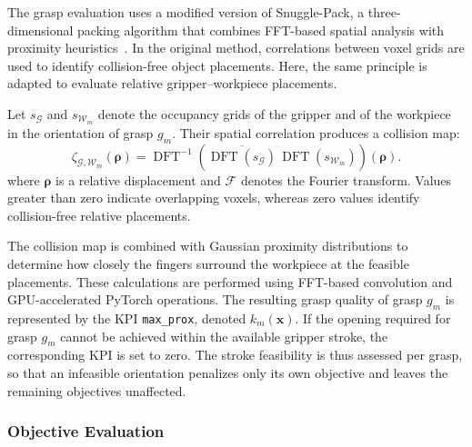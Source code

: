 The grasp evaluation uses a modified version of Snuggle-Pack, a three-dimensional packing algorithm
that combines FFT-based spatial analysis with proximity heuristics~\cite{snuggle_pack}. In the
original method, correlations between voxel grids are used to identify collision-free object
placements. Here, the same principle is adapted to evaluate relative gripper--workpiece placements.

Let $s_{\mathcal{G}}$ and $s_{\mathcal{W}_m}$ denote the occupancy grids of the gripper and of the
workpiece in the orientation of grasp $g_m$. Their spatial correlation produces a collision map:
\begin{equation}
    \zeta_{\mathcal{G},\mathcal{W}_m}(\boldsymbol{\rho})
    =
    \operatorname{DFT}^{-1}
    \left(
        \overline{\operatorname{DFT}(s_{\mathcal{G}})}
        \,\operatorname{DFT}(s_{\mathcal{W}_m})
    \right)(\boldsymbol{\rho}).
\end{equation}
where $\boldsymbol{\rho}$ is a relative displacement and $\mathcal{F}$ denotes the Fourier transform.
Values greater than zero indicate overlapping voxels, whereas zero values identify collision-free
relative placements.

The collision map is combined with Gaussian proximity distributions to determine how closely the
fingers surround the workpiece at the feasible placements. These calculations are performed using
FFT-based convolution and GPU-accelerated PyTorch operations. The resulting grasp quality of grasp
$g_m$ is represented by the KPI \texttt{max\_prox}, denoted $k_m(\mathbf{x})$. If the opening
required for grasp $g_m$ cannot be achieved within the available gripper stroke, the corresponding
KPI is set to zero. The stroke feasibility is thus assessed per grasp, so that an infeasible
orientation penalizes only its own objective and leaves the remaining objectives unaffected.


\subsubsection{Objective Evaluation}
\label{sec:two_finger_objective_evaluation}

